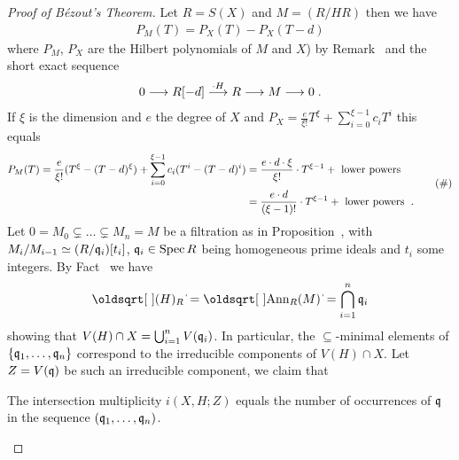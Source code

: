 \documentclass[a4paper,parskip=half,numbers=enddot, DIV=12, headheight=30pt]{scrreprt}
\begin{document}
\begin{proof}[Proof of B\'ezout's Theorem]
    Let $R=S(X)$ and $M=(R/HR)$ then we have
    \begin{align*}
        P_M(T) = P_X(T) - P_X(T-d)
    \end{align*}
    where $P_M$, $P_X$ are the Hilbert polynomials of $M$ and $X$) by Remark~ and the short exact sequence
    \begin{align*}
        0\morphism R[-d] \morphism[\cdot H]R \morphism M \morphism 0\;.
    \end{align*}
    If $\xi$ is the dimension and $e$ the degree of $X$ and $P_X=\frac{e}{\xi!}T^\xi+\sum_{i=0}^{\xi-1}c_iT^i$ this equals
    \begin{align*}
    \begin{split}
        P_M(T)=\frac{e}{\xi!}(T^\xi-(T-d)^\xi) + \sum_{i=0}^{\xi-1} c_i(T^i- (T-d)^i) &= \frac{e\cdot d\cdot \xi}{\xi!}\cdot T^{\xi-1} + \text{ lower powers } \\
        &= \frac{e\cdot d}{(\xi-1)!}\cdot T^{\xi-1} +\text{ lower powers }\;.
        \end{split}\tag{\#}\lbl{eq:bezout}
    \end{align*}
    Let $0=M_0\subsetneq \ldots \subsetneq M_n = M$ be a filtration as in Proposition~, with $M_i/M_{i-1} \simeq (R/\mathfrak{q}_i)[t_i]$, $\mathfrak{q}_i\in\operatorname{Spec} R$ being homogeneous prime ideals and $t_i$ some integers. By Fact~ we have    
    \begin{align*}
        \sqrt{(H)_R} = \sqrt{\Ann_R(M)} = \bigcap_{i=1}^n \qq_i
    \end{align*}
    showing that $V(H)\cap X = \bigcup_{i=1}^n V(\mathfrak{q}_i)$. In particular, the $\subseteq$-minimal elements of $\{\mathfrak{q}_1,\ldots,\mathfrak{q}_n\}$ correspond to the irreducible components of $V(H)\cap X$. Let $Z=V(\mathfrak{q})$ be such an irreducible component, we claim that 
    \begin{claim}
    	The intersection multiplicity $i(X,H;Z)$ equals the number of occurrences of $\mathfrak{q}$ in the sequence $(\mathfrak{q}_1,\ldots,\mathfrak{q}_n)$.
    \end{claim}
    

\end{proof}
\end{document}
